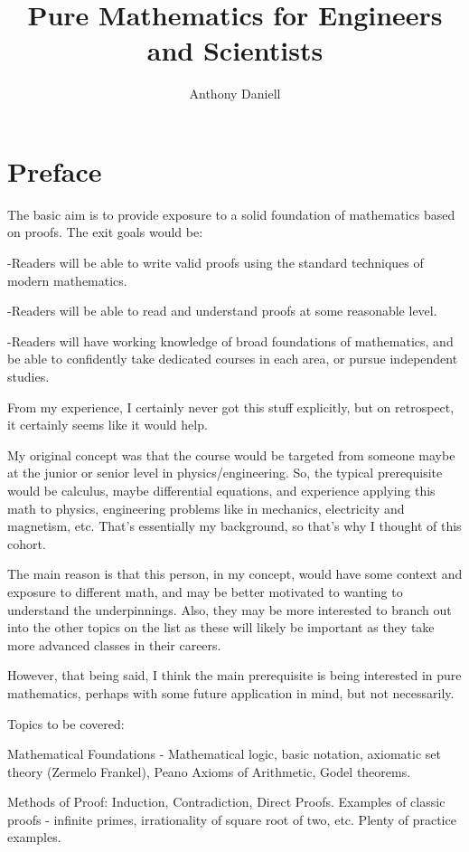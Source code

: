 \documentclass{book}
\title{Pure Mathematics for Engineers and Scientists}
\author{Anthony Daniell}
\begin{document}
\maketitle 


\chapter*{Preface}


The basic aim is to provide exposure to a solid foundation of mathematics based on proofs.  The exit goals would be:

-Readers will be able to write valid proofs using the standard techniques of modern mathematics.

-Readers will be able to read and understand proofs at some reasonable level.

-Readers will have working knowledge of broad foundations of mathematics, and be able to confidently take dedicated courses in each area, or pursue independent studies.
    
    
From my experience, I certainly never got this stuff explicitly, but on retrospect, it certainly seems like it would help.     


My original concept was that the course would be targeted from someone maybe at the junior or senior level in physics/engineering.  So, the typical prerequisite would be calculus, maybe differential equations, and experience applying this math to physics, engineering problems like in mechanics, electricity and magnetism, etc.  That's essentially my background, so that's why I thought of this cohort.

The main reason is that this person, in my concept, would have some context and exposure to different math, and may be better motivated to wanting to understand the underpinnings.  Also, they may be more interested to branch out into the other topics on the list as these will likely be important as they take more advanced classes in their careers.

However, that being said, I think the main prerequisite is being interested in pure mathematics, perhaps with some future application in mind, but not necessarily.


Topics to be covered:

    Mathematical Foundations - Mathematical logic, basic notation, axiomatic set theory (Zermelo Frankel), Peano Axioms of Arithmetic, Godel theorems.


    Methods of Proof:  Induction, Contradiction, Direct Proofs.  Examples of classic proofs - infinite primes, irrationality of square root of two, etc.  Plenty of practice examples.
\end{document}
